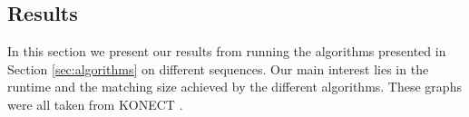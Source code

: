 \documentclass{article}      %
\begin{document}



\subsection{Results}
\label{sec:results}

In this section we present our results from running the algorithms presented in Section \ref{sec:algorithms} on different sequences. Our main interest lies in the runtime and the matching size achieved by the different algorithms. These graphs were all taken from KONECT \cite{konect}.
\end{document}
